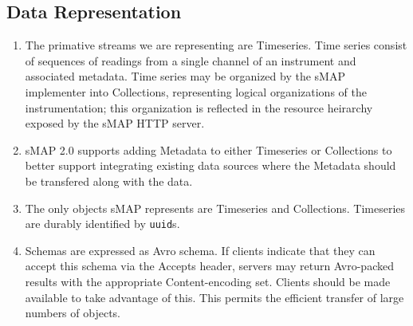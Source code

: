 \documentclass[10pt,letterpaper]{article}
\newcommand{\smap}{sMAP}
\newcommand{\smapversion}{2.0}
\begin{document}
\subsection{Data Representation}
\begin{enumerate}
\item The primative streams we are representing are Timeseries.  Time series
  consist of sequences of readings from a single channel of an instrument and
  associated metadata.
  Time series may be organized by the \smap{} implementer into Collections,
  representing logical organizations of the instrumentation; this organization
  is reflected in the resource heirarchy exposed by the \smap{} HTTP server.
\item \smap{} \smapversion{} supports adding Metadata to either Timeseries or
  Collections to better support integrating existing data sources where the
  Metadata should be transfered along with the data.
\item The only objects \smap{} represents are Timeseries and Collections.
  Timeseries are durably identified by {\tt uuid}s.
\item Schemas are expressed as Avro schema.  If clients indicate that they
  can accept this schema via the Accepts header, servers may return
  Avro-packed results with the appropriate Content-encoding set.  Clients
  should be made available to take advantage of this.  This permits the
  efficient transfer of large numbers of objects.
\end{enumerate}
\end{document}
